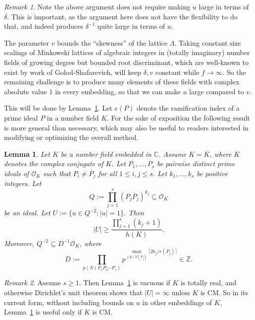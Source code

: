 \documentclass[11pt,reqno]{amsart}
\numberwithin{equation}{section}
\newtheorem{lemma}[lemma]{Lemma}
\theoremstyle{definition}
\theoremstyle{remark}
\newtheorem*{remark}{Remark}
\newcommand{\C}{\mathbb{C}}
\newcommand{\Z}{\mathbb{Z}}
\renewcommand{\O}{\mathcal{O}}
\begin{document}
\begin{remark}
    Note the above argument does not require making $u$ large in terms of $\delta$.  This is important, as the argument here does not have the flexibility to do that, and indeed produces $\delta^{-1}$ quite large in terms of $u$.
\end{remark}

The parameter $v$ bounds the ``skewness'' of the lattice $\Lambda$.
Taking constant size scalings of Minkowski lattices of algebraic integers in (totally imaginary) number fields of growing degree but bounded root discriminant, which are well-known to exist by work of Golod-Shafarevich, will keep $\delta,v$ constant while $f\rightarrow\infty$.
So the remaining challenge is to produce many elements of these fields with complex absolute value $1$ in every embedding, so that we can make $u$ large compared to $v$.

This will be done by Lemma~\ref{pigeons}. 
Let $e(P)$ denote the ramification index of a prime ideal $P$ in a number field $K$.
For the sake of exposition the following result is more general than necessary,
which may also be useful to readers interested in
modifying or optimizing the overall method.
\begin{lemma}
\label{pigeons}
Let $K$ be a number field embedded in $\C$.
Assume $K = \overline{K}$,
where $\overline{K}$ denotes the complex conjugate of $K$.
Let $P_1,\dots,P_s$ be pairwise distinct prime ideals of $\O_K$
such that $P_i \ne \overline{P}_j$ for all $1\le i,j\le s$.
Let $k_1,\dots,k_s$ be positive integers.
Let $$Q := \prod_{j=1}^{s} (P_j\overline{P}_j)^{k_j}
\subseteq \O_K$$
be an ideal.
Let $U := \{u\in Q^{-2}: |u| = 1\}$.
Then $$|U| \ge \frac{\prod_{j=1}^{s} (k_j+1)}{h(K)}.$$
Moreover, $Q^{-2} \subseteq D^{-1} \O_K$, where
$$D := \prod_{p\mid N(P_1P_2\cdots P_s)}
p^{\max_{j: p\mid N(P_j)} \lceil{2k_j/e(P_j)}\rceil} \in \Z.$$
\end{lemma}


\begin{remark}
Assume $s\ge 1$.
Then Lemma~\ref{pigeons} is vacuous if $K$ is totally real,
and otherwise Dirichlet's unit theorem shows that $|U| = \infty$
unless $K$ is CM. 
So in its current form, without including bounds on $u$ in other embeddings of $K$,
Lemma~\ref{pigeons} is useful only if $K$ is CM.
\end{remark}
\end{document}

